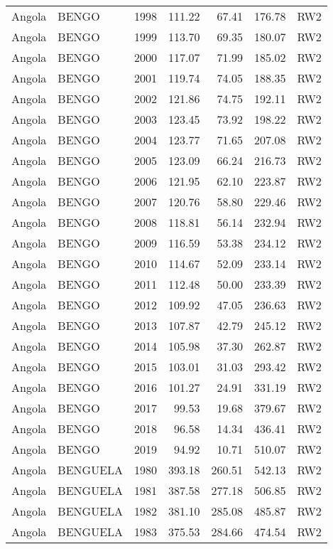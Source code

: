 \begin{longtable}{lllrrrl}
  Angola & BENGO & 1998 & 111.22 & 67.41 & 176.78 & RW2 \\ 
  Angola & BENGO & 1999 & 113.70 & 69.35 & 180.07 & RW2 \\ 
  Angola & BENGO & 2000 & 117.07 & 71.99 & 185.02 & RW2 \\ 
  Angola & BENGO & 2001 & 119.74 & 74.05 & 188.35 & RW2 \\ 
  Angola & BENGO & 2002 & 121.86 & 74.75 & 192.11 & RW2 \\ 
  Angola & BENGO & 2003 & 123.45 & 73.92 & 198.22 & RW2 \\ 
  Angola & BENGO & 2004 & 123.77 & 71.65 & 207.08 & RW2 \\ 
  Angola & BENGO & 2005 & 123.09 & 66.24 & 216.73 & RW2 \\ 
  Angola & BENGO & 2006 & 121.95 & 62.10 & 223.87 & RW2 \\ 
  Angola & BENGO & 2007 & 120.76 & 58.80 & 229.46 & RW2 \\ 
  Angola & BENGO & 2008 & 118.81 & 56.14 & 232.94 & RW2 \\ 
  Angola & BENGO & 2009 & 116.59 & 53.38 & 234.12 & RW2 \\ 
  Angola & BENGO & 2010 & 114.67 & 52.09 & 233.14 & RW2 \\ 
  Angola & BENGO & 2011 & 112.48 & 50.00 & 233.39 & RW2 \\ 
  Angola & BENGO & 2012 & 109.92 & 47.05 & 236.63 & RW2 \\ 
  Angola & BENGO & 2013 & 107.87 & 42.79 & 245.12 & RW2 \\ 
  Angola & BENGO & 2014 & 105.98 & 37.30 & 262.87 & RW2 \\ 
  Angola & BENGO & 2015 & 103.01 & 31.03 & 293.42 & RW2 \\ 
  Angola & BENGO & 2016 & 101.27 & 24.91 & 331.19 & RW2 \\ 
  Angola & BENGO & 2017 & 99.53 & 19.68 & 379.67 & RW2 \\ 
  Angola & BENGO & 2018 & 96.58 & 14.34 & 436.41 & RW2 \\ 
  Angola & BENGO & 2019 & 94.92 & 10.71 & 510.07 & RW2 \\ 
  Angola & BENGUELA & 1980 & 393.18 & 260.51 & 542.13 & RW2 \\ 
  Angola & BENGUELA & 1981 & 387.58 & 277.18 & 506.85 & RW2 \\ 
  Angola & BENGUELA & 1982 & 381.10 & 285.08 & 485.87 & RW2 \\ 
  Angola & BENGUELA & 1983 & 375.53 & 284.66 & 474.54 & RW2 \\ 

\end{longtable}
